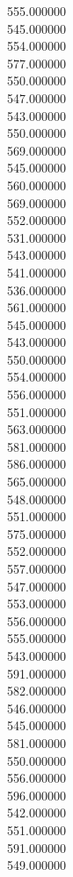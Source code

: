 555.000000\\
545.000000\\
554.000000\\
577.000000\\
550.000000\\
547.000000\\
543.000000\\
550.000000\\
569.000000\\
545.000000\\
560.000000\\
569.000000\\
552.000000\\
531.000000\\
543.000000\\
541.000000\\
536.000000\\
561.000000\\
545.000000\\
543.000000\\
550.000000\\
554.000000\\
556.000000\\
551.000000\\
563.000000\\
581.000000\\
586.000000\\
565.000000\\
548.000000\\
551.000000\\
575.000000\\
552.000000\\
557.000000\\
547.000000\\
553.000000\\
556.000000\\
555.000000\\
543.000000\\
591.000000\\
582.000000\\
546.000000\\
545.000000\\
581.000000\\
550.000000\\
556.000000\\
596.000000\\
542.000000\\
551.000000\\
591.000000\\
549.000000\\
